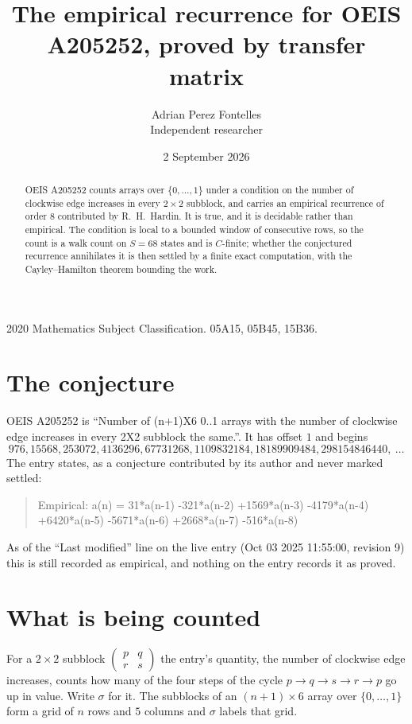 \documentclass[11pt,a4paper]{article}
\title{The empirical recurrence for OEIS A205252, proved by transfer matrix}
\author{Adrian Perez Fontelles\\ \small Independent researcher}
\date{2 September 2026}
\theoremstyle{plain}
\theoremstyle{definition}
\begin{document}
\maketitle

\begin{abstract}
OEIS A205252 counts arrays over $\{0,\dots,1\}$ under a condition on the number of clockwise edge increases
in every $2\times2$ subblock, and carries an empirical recurrence of order $8$ contributed by
R.~H.~Hardin. It is true, and it is decidable rather than empirical. The condition is local to
a bounded window of consecutive rows, so the count is a walk count on $S=68$ states and is
$C$-finite; whether the conjectured recurrence annihilates it is then settled by a finite exact
computation, with the Cayley--Hamilton theorem bounding the work.
\end{abstract}

\noindent\small 2020 Mathematics Subject Classification. 05A15, 05B45, 15B36.\normalsize

\section{The conjecture}

OEIS A205252 is ``Number of (n+1)X6 0..1 arrays with the number of clockwise edge increases in every 2X2 subblock the same.''. It has offset $1$ and begins
\[
976, 15568, 253072, 4136296, 67731268, 1109832184, 18189909484, 298154846440,\ \dots
\]
The entry states, as a conjecture contributed by its author and never marked settled:
\begin{quote}
Empirical: a(n) = 31*a(n-1) -321*a(n-2) +1569*a(n-3) -4179*a(n-4) +6420*a(n-5) -5671*a(n-6) +2668*a(n-7) -516*a(n-8)
\end{quote}
As of the ``Last modified'' line on the live entry (Oct 03 2025 11:55:00, revision 9) this is still
recorded as empirical, and nothing on the entry records it as proved.

\section{What is being counted}

For a $2\times2$ subblock $\begin{pmatrix}p&q\\r&s\end{pmatrix}$ the
entry's quantity, the number of clockwise edge increases, counts how many of the four steps of the cycle $p\to q\to s\to r\to p$ go up in value. Write $\sigma$ for it. The subblocks of an
$(n+1)\times6$ array over $\{0,\dots,1\}$ form a grid of $n$ rows and $5$
columns and $\sigma$ labels that grid.
\end{document}
